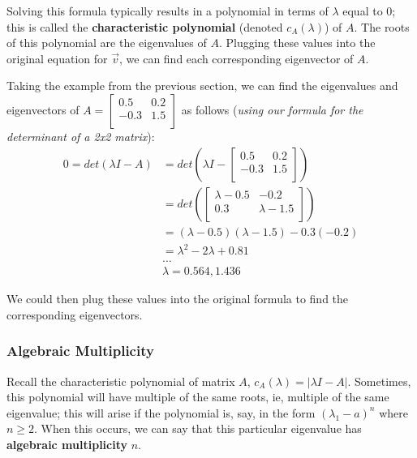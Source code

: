 \documentclass[12pt]{article}
\begin{document}
{Solving this formula typically results in a polynomial in terms of $\lambda$ equal to 0; this is called the \textbf{characteristic polynomial} (denoted $c_A(\lambda)$) of $A$. The roots of this polynomial are the eigenvalues of $A$. Plugging these values into the original equation for $\vec{v}$, we can find each corresponding eigenvector of $A$.

Taking the example from the previous section, we can find the eigenvalues and eigenvectors of $A = \begin{bmatrix}
    0.5 & 0.2\\
    -0.3 & 1.5\\
\end{bmatrix}$ as follows (\textit{using our formula for the determinant of a 2x2 matrix}):
\begin{align*}
    0 = det(\lambda I - A) &= det(\lambda I - \begin{bmatrix}
        0.5 & 0.2\\
        -0.3 & 1.5\\
    \end{bmatrix})\\
    &= det(\begin{bmatrix}
    \lambda-0.5 & -0.2\\
    0.3 & \lambda-1.5\\
    \end{bmatrix})\\
    &= (\lambda - 0.5)(\lambda - 1.5) - 0.3(-0.2)\\
    &= \lambda^2-2\lambda+0.81\\
    &\dots\\
    & \lambda = 0.564, 1.436
\end{align*}

We could then plug these values into the original formula to find the corresponding eigenvectors.

\subsubsection{Algebraic Multiplicity}

Recall the characteristic polynomial of matrix $A$, $c_A(\lambda) = |\lambda I - A|$. Sometimes, this polynomial will have multiple of the same roots, ie, multiple of the same eigenvalue; this will arise if the polynomial is, say, in the form $(\lambda_1-a)^n$ where $n\geq 2$. When this occurs, we can say that this particular eigenvalue has \textbf{algebraic multiplicity} $n$.

}
\end{document}
